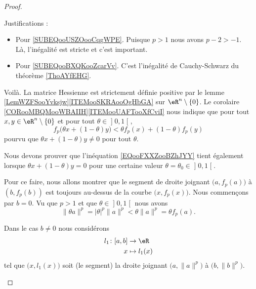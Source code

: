 \begin{proof}
\begin{subproof}
		Justifications :
		\begin{itemize}
			\item Pour \ref{SUBEQooUSZOooCqgWPE}.
			      Puisque \( p>1\) nous avons \( p-2>-1\). Là, l'inégalité est stricte et c'est important.
			\item Pour \ref{SUBEQooBXQKooZcarVv}. C'est l'inégalité de Cauchy-Schwarz du théorème \ref{ThoAYfEHG}.
		\end{itemize}
		Voilà. La matrice Hessienne est strictement définie positive par le lemme \ref{LemWZFSooYvksjw}\ref{ITEMooSKRAooOgHbGA} sur \( \eR^n\setminus\{ 0 \}\). Le corolaire \ref{CORooMBQMooWBAIIH}\ref{ITEMooUAFTooXfCviI} nous indique que pour tout \( x,y\in \eR^n\setminus\{ 0 \}\) et pour tout \( \theta\in \mathopen] 0 , 1 \mathclose[\),
			\begin{equation}        \label{EQooFXXZooBZhJYY}
				f_p\big( \theta x+(1-\theta)y \big)<\theta f_p(x)+(1-\theta)f_p(y)
			\end{equation}
			pourvu que \( \theta x+ (1-\theta)y\neq 0\) pour tout \( \theta\).

			\spitem[La suite]

			Nous devons prouver que l'inéquation \eqref{EQooFXXZooBZhJYY} tient également lorsque \( \theta x+(1-\theta)y=0\) pour une certaine valeur \( \theta=\theta_0\in \mathopen] 0 , 1 \mathclose[\).


			Pour ce faire, nous allons montrer que le segment de droite joignant \( \big( a,f_p(a) \big)\) à \( (b,f_p(b))\) est toujours au-dessus de la courbe \( \big( x,f_p(x) \big)\). Nous commençons par \( b=0\). Vu que \( p>1\) et que \( \theta\in \mathopen] 0 , 1 \mathclose[\) nous avons
			\begin{equation}
				\| \theta a \|^p=| \theta |^p\| a \|^p<\theta\| a \|^p=\theta f_p(a).
			\end{equation}


			Dans le cas \( b\neq 0\) nous considérons
			\begin{equation}
				\begin{aligned}
					l_1\colon \mathopen[ a , b \mathclose] & \to \eR        \\
					x                                      & \mapsto l_1(x)
				\end{aligned}
			\end{equation}
			tel que \( \big( x,l_1(x) \big)\) soit (le segment) la droite joignant \( \big( a,\| a \|^p \big)\) à \( \big( b,\| b \|^p \big)\).


\end{subproof}
\end{proof}
